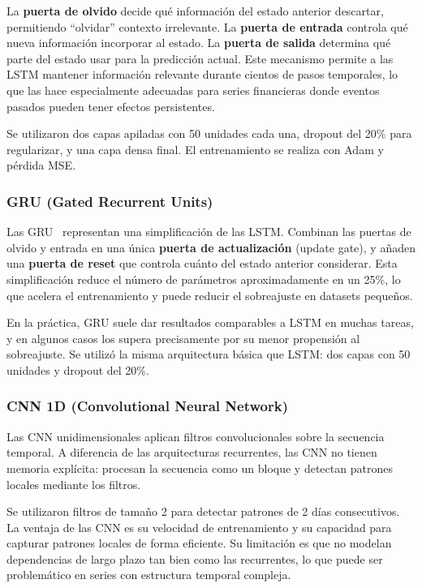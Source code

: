 La \textbf{puerta de olvido} decide qué información del estado anterior descartar, permitiendo ``olvidar'' contexto irrelevante. La \textbf{puerta de entrada} controla qué nueva información incorporar al estado. La \textbf{puerta de salida} determina qué parte del estado usar para la predicción actual. Este mecanismo permite a las LSTM mantener información relevante durante cientos de pasos temporales, lo que las hace especialmente adecuadas para series financieras donde eventos pasados pueden tener efectos persistentes.

Se utilizaron dos capas apiladas con 50 unidades cada una, dropout del 20\% para regularizar, y una capa densa final. El entrenamiento se realiza con Adam y pérdida MSE.

\subsubsection{GRU (Gated Recurrent Units)}

Las GRU~\cite{cho2014learning} representan una simplificación de las LSTM. Combinan las puertas de olvido y entrada en una única \textbf{puerta de actualización} (update gate), y añaden una \textbf{puerta de reset} que controla cuánto del estado anterior considerar. Esta simplificación reduce el número de parámetros aproximadamente en un 25\%, lo que acelera el entrenamiento y puede reducir el sobreajuste en datasets pequeños.

En la práctica, GRU suele dar resultados comparables a LSTM en muchas tareas, y en algunos casos los supera precisamente por su menor propensión al sobreajuste. Se utilizó la misma arquitectura básica que LSTM: dos capas con 50 unidades y dropout del 20\%.

\subsubsection{CNN 1D (Convolutional Neural Network)}

Las CNN unidimensionales aplican filtros convolucionales sobre la secuencia temporal. A diferencia de las arquitecturas recurrentes, las CNN no tienen memoria explícita: procesan la secuencia como un bloque y detectan patrones locales mediante los filtros.

Se utilizaron filtros de tamaño 2 para detectar patrones de 2 días consecutivos. La ventaja de las CNN es su velocidad de entrenamiento y su capacidad para capturar patrones locales de forma eficiente. Su limitación es que no modelan dependencias de largo plazo tan bien como las recurrentes, lo que puede ser problemático en series con estructura temporal compleja.

